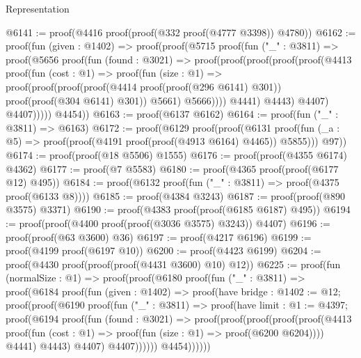 \begin{lexlean}{Representation}
\begin{coremodule}
@6141 := proof(@4416 proof(proof(@332 proof(@4777 @3398)) @4780))
@6162 := proof(fun (given : @1402) =>
    proof(proof(@5715
          proof(fun ("_" : @3811) =>
            proof(@5656
                proof(fun (found : @3021) =>
                  proof(proof(proof(proof(proof(@4413
                              proof(fun (cost : @1) =>
                                proof(fun (size : @1) =>
                                  proof(proof(proof(proof(@4414 proof(proof(@296 @6141) @301))
                                          proof(proof(@304 @6141) @301))
                                        @5661)
                                      @5666))))
                            @4441)
                          @4443)
                        @4407)
                      @4407)))))
        @4454))
@6163 := proof(@6137 @6162)
@6164 := proof(fun ("_" : @3811) => @6163)
@6172 := proof(@6129
      proof(proof(@6131
            proof(fun (_a : @5) => proof(proof(@4191 proof(proof(@4913 @6164) @4465)) @5855)))
          @97))
@6174 := proof(proof(@18 @5506) @1555)
@6176 := proof(proof(@4355 @6174) @4362)
@6177 := proof(@7 @5583)
@6180 := proof(@4365 proof(proof(@6177 @12) @495))
@6184 := proof(@6132 proof(fun ("_" : @3811) => proof(@4375 proof(@6133 @8))))
@6185 := proof(@4384 @3243)
@6187 := proof(proof(@890 @3575) @3371)
@6190 := proof(@4383 proof(proof(@6185 @6187) @495))
@6194 := proof(proof(@4400 proof(proof(@3036 @3575) @3243)) @4407)
@6196 := proof(proof(@63 @3600) @36)
@6197 := proof(@4217 @6196)
@6199 := proof(@4199 proof(@6197 @10))
@6200 := proof(@4423 @6199)
@6204 := proof(@4430 proof(proof(proof(@4431 @3600) @10) @12))
@6225 := proof(fun (normalSize : @1) =>
    proof(proof(@6180
          proof(fun ("_" : @3811) =>
            proof(@6184
                proof(fun (given : @1402) =>
                  proof(have bridge : @1402 := @12;
                    proof(proof(@6190
                          proof(fun ("_" : @3811) =>
                            proof(have limit : @1 := @4397;
                              proof(@6194
                                  proof(fun (found : @3021) =>
                                    proof(proof(proof(proof(proof(@4413
                                                proof(fun (cost : @1) =>
                                                  proof(fun (size : @1) => proof(@6200 @6204))))
                                              @4441)
                                            @4443)
                                          @4407)
                                        @4407))))))
                        @4454))))))

\end{coremodule}
\end{lexlean}
